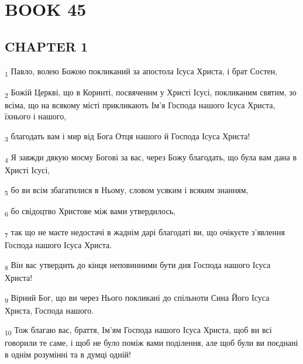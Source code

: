 \section{BOOK 45}
\subsection{CHAPTER 1}
\begin{tcolorbox}
\textsubscript{1} Павло, волею Божою покликаний за апостола Ісуса Христа, і брат Состен,
\end{tcolorbox}
\begin{tcolorbox}
\textsubscript{2} Божій Церкві, що в Коринті, посвяченим у Христі Ісусі, покликаним святим, зо всіма, що на всякому місті прикликають Ім'я Господа нашого Ісуса Христа, їхнього і нашого,
\end{tcolorbox}
\begin{tcolorbox}
\textsubscript{3} благодать вам і мир від Бога Отця нашого й Господа Ісуса Христа!
\end{tcolorbox}
\begin{tcolorbox}
\textsubscript{4} Я завжди дякую моєму Богові за вас, через Божу благодать, що була вам дана в Христі Ісусі,
\end{tcolorbox}
\begin{tcolorbox}
\textsubscript{5} бо ви всім збагатилися в Ньому, словом усяким і всяким знанням,
\end{tcolorbox}
\begin{tcolorbox}
\textsubscript{6} бо свідоцтво Христове між вами утвердилось,
\end{tcolorbox}
\begin{tcolorbox}
\textsubscript{7} так що не маєте недостачі в жаднім дарі благодаті ви, що очікуєте з'явлення Господа нашого Ісуса Христа.
\end{tcolorbox}
\begin{tcolorbox}
\textsubscript{8} Він вас утвердить до кінця неповинними бути дня Господа нашого Ісуса Христа!
\end{tcolorbox}
\begin{tcolorbox}
\textsubscript{9} Вірний Бог, що ви через Нього покликані до спільноти Сина Його Ісуса Христа, Господа нашого.
\end{tcolorbox}
\begin{tcolorbox}
\textsubscript{10} Тож благаю вас, браття, Ім'ям Господа нашого Ісуса Христа, щоб ви всі говорили те саме, і щоб не було поміж вами поділення, але щоб були ви поєднані в однім розумінні та в думці одній!
\end{tcolorbox}
